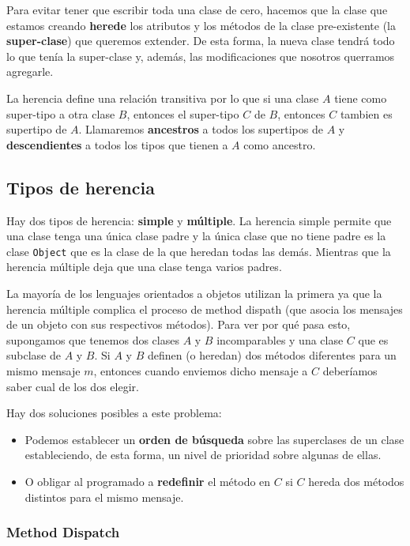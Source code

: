 Para evitar tener que escribir toda una clase de cero, hacemos que la clase que estamos creando \textbf{herede} los atributos y los métodos de la clase pre-existente (la \textbf{super-clase}) que queremos extender. De esta forma, la nueva clase tendrá todo lo que tenía la super-clase y, además, las modificaciones que nosotros querramos agregarle.

La herencia define una relación transitiva por lo que si una clase $A$ tiene como super-tipo a otra clase $B$, entonces el super-tipo $C$ de $B$, entonces $C$ tambien es supertipo de $A$. Llamaremos \textbf{ancestros} a todos los supertipos de $A$ y \textbf{descendientes} a todos los tipos que tienen a $A$ como ancestro.

\subsection{Tipos de herencia}
Hay dos tipos de herencia: \textbf{simple} y \textbf{múltiple}. La herencia simple permite que una clase tenga una única clase padre y la única clase que no tiene padre es la clase \texttt{Object} que es la clase de la que heredan todas las demás. Mientras que la herencia múltiple deja que una clase tenga varios padres.

La mayoría de los lenguajes orientados a objetos utilizan la primera ya que la herencia múltiple complica el proceso de method dispath (que asocia los mensajes de un objeto con sus respectivos métodos). Para ver por qué pasa esto, supongamos que tenemos dos clases $A$ y $B$ incomparables y una clase $C$ que es subclase de $A$ y $B$. Si $A$ y $B$ definen (o heredan) dos métodos diferentes para un mismo mensaje $m$, entonces cuando enviemos dicho mensaje a $C$ deberíamos saber cual de los dos elegir.

Hay dos soluciones posibles a este problema:
\begin{itemize}
\item Podemos establecer un \textbf{orden de búsqueda} sobre las superclases de un clase estableciendo, de esta forma, un nivel de prioridad sobre algunas de ellas.
\item O obligar al programado a \textbf{redefinir} el método en $C$ si $C$ hereda dos métodos distintos para el mismo mensaje.
\end{itemize}

\subsubsection{Method Dispatch}

